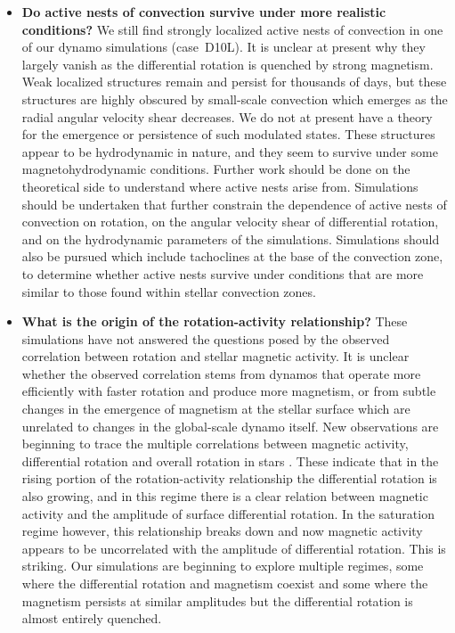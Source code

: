 \begin{itemize}
   \item \textbf{Do active nests of convection survive under more realistic conditions?}
     We still find strongly localized active nests of convection in
     one of our dynamo simulations (case~D10L).  It is unclear at
     present why they largely vanish as the differential rotation is
     quenched by strong magnetism.  Weak localized structures remain
     and persist for thousands of days, but these structures are
     highly obscured by small-scale convection which emerges as the
     radial angular velocity shear decreases.  We do not at present
     have a theory for the emergence or persistence of such modulated
     states.  These structures appear to be hydrodynamic in nature,
     and they seem to survive under some magnetohydrodynamic
     conditions.  Further work should be done on the theoretical side to
     understand where active nests arise from.  Simulations should be
     undertaken that further constrain the dependence of active nests
     of convection on rotation, on the angular velocity shear of
     differential rotation, and on the hydrodynamic parameters of the
     simulations.  Simulations should also be pursued which include
     tachoclines at the base of the convection zone, to determine
     whether active nests survive under conditions that are more
     similar to those found within stellar convection zones.   

   \item \textbf{What is the origin of the rotation-activity relationship?}
     These simulations have not answered the questions posed by the
     observed correlation between rotation and stellar magnetic
     activity.  It is unclear whether the observed correlation stems
     from dynamos that operate more efficiently with faster rotation
     and produce more magnetism, or from subtle changes in the
     emergence of magnetism at the stellar surface which are unrelated
     to changes in the global-scale dynamo itself.  New observations are
     beginning to trace the multiple correlations between magnetic
     activity, differential rotation and overall rotation in stars
     \citep[e.g.,][]{Saar_2008}.  These indicate that in the rising portion of the
     rotation-activity relationship the differential rotation is also
     growing, and in this regime there is a clear relation between
     magnetic activity  and the amplitude of surface differential
     rotation.  In the saturation regime 
     however, this relationship breaks down and now magnetic activity
     appears to be uncorrelated with the amplitude of differential
     rotation.  This is striking.  Our simulations are beginning to
     explore multiple regimes, some where the differential rotation
     and magnetism coexist and some where the magnetism persists at
     similar amplitudes but the differential rotation is almost
     entirely quenched.


\end{itemize}

